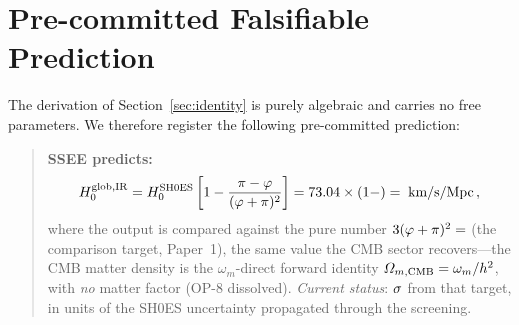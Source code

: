 \documentclass[12pt,a4paper]{article}
\newcommand{\phiG}{\varphi}
\renewcommand{\Omega}{\varOmega}
\begin{document}
\section{Pre-committed Falsifiable Prediction}
\label{sec:prediction}

The derivation of Section~\ref{sec:identity} is purely algebraic and carries
no free parameters.
We therefore register the following pre-committed prediction:

\begin{quote}
\textbf{SSEE predicts:}
\begin{equation}
  H_0^{\rm glob,IR} = H_0^{\rm SH0ES}\left[1-\frac{\pi-\phiG}{(\phiG+\pi)^2}\right]
  = 73.04\times(1-\val{F_SCREEN_IR_d5}) = \val{p9_sh0es_glob_IR}\;\text{km/s/Mpc}\,,
  \label{eq:prediction}
\end{equation}
where the output is compared against the pure number
$3(\phiG+\pi)^2 = \val{H0_ALG_d5}$ (the comparison target, Paper~1), the same value the CMB sector
recovers---the
CMB matter density is the $\omega_m$-direct forward identity
$\Omega_{m,\rm CMB}=\omega_m/h^2$, with \emph{no} matter factor (OP-8 dissolved).
\textit{Current status}: $\val{p9_sh0es_sig_IR}\sigma$ from that target, in units of the SH0ES
uncertainty \citep{Riess2022} propagated through the screening.
\end{quote}
\end{document}
